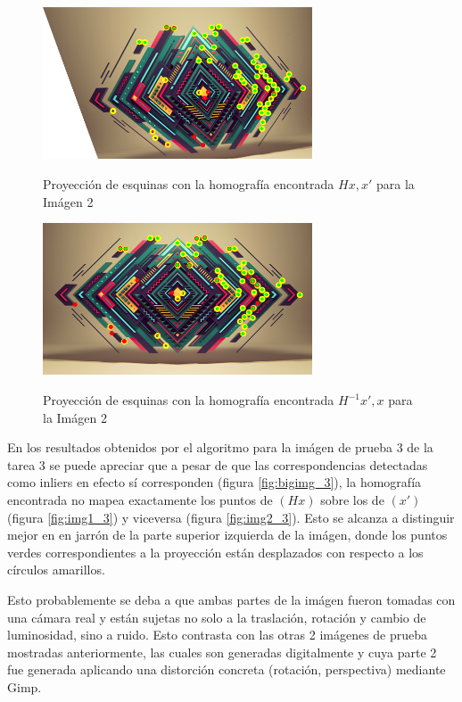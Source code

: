 \documentclass{IEEEtran}
\begin{document}
\begin{figure}[H]
\caption{Proyección de esquinas con la homografía encontrada $Hx, x'$ para la Imágen 2}
\centering
\includegraphics[width=8cm,natwidth=600,natheight=450]{figs/img2_2.png}
\label{fig:img2_2}
\end{figure}

\begin{figure}[H]
\caption{Proyección de esquinas con la homografía encontrada $H^{-1}x', x$ para la Imágen 2}
\centering
\includegraphics[width=8cm,natwidth=600,natheight=450]{figs/img1_2.png}
\label{fig:img1_2}
\end{figure}

En los resultados obtenidos por el algoritmo para la imágen de prueba 3
de la tarea 3 se puede apreciar que a pesar de que
las correspondencias detectadas como inliers en efecto sí corresponden 
(figura \ref{fig:bigimg_3}), la homografía encontrada no mapea exactamente
los puntos de $(Hx)$ sobre los de $(x')$ (figura \ref{fig:img1_3}) y viceversa
(figura \ref{fig:img2_3}).
Esto se alcanza a distinguir mejor en en jarrón de la parte superior izquierda
de la imágen, donde los puntos verdes correspondientes a la proyección 
están desplazados con respecto a los círculos amarillos.

Esto probablemente se deba a que ambas partes de la imágen fueron tomadas con
una cámara real y están sujetas no solo a la traslación, rotación y cambio de
luminosidad, sino a ruido. Esto contrasta con las otras 2 imágenes de prueba
mostradas anteriormente, las cuales son generadas digitalmente y cuya 
parte 2 fue generada aplicando una distorción concreta (rotación, perspectiva)
mediante Gimp.
\end{document}

